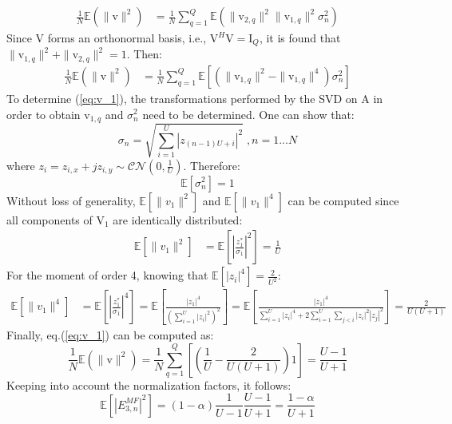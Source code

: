\documentclass[12pt, draftclsnofoot, onecolumn]{IEEEtran}
\newcommand{\EX}[1]{\mathbb{E} \left[#1\right]}%
\newcommand{\vect}[1]{\boldsymbol{\mathrm{#1}}}
\newcommand{\mat}[1]{\boldsymbol{\mathrm{#1}}}
\begin{document}
\begin{align}
\frac{1}{N}\mathbb{E}\left(\|\vect{v}\|^2\right) &=\frac{1}{N}\sum_{q=1}^Q \mathbb{E} \left( \| \vect{v}_{2,q}\|^2 \| \vect{v}_{1,q}\|^2 \sigma_n^2  \right)
\end{align}
Since $\mat{V}$ forms an orthonormal basis, i.e., $\mat{V}^H \mat{V} = \mat{I}_Q$, it is found that $ \| \vect{v}_{1,q}\|^2 +  \| \vect{v}_{2,q}\|^2 = 1$. Then:
\begin{align}
\frac{1}{N}\mathbb{E}\left(\|\vect{v}\|^2\right) &=\frac{1}{N}\sum_{q=1}^Q \mathbb{E} \left[ \left( \| \vect{v}_{1,q}\|^2 - \| \vect{v}_{1,q}\|^4 \right) \sigma_n^2  \right]
\label{eq:v_1}
\end{align}
To determine (\ref{eq:v_1}), the transformations performed by the SVD on $\mat{A}$ in order to obtain $\vect{v}_{1,q}$ and $\sigma^2_n$ need to be determined. One can show that:
\begin{equation}
	\sigma_n = \sqrt{\sum_{i=1}^{U} \left| z_{(n-1)U+i}\right|^2} \; , n = 1...N
\end{equation}
where $z_i  = z_{i,x} + jz_{i,y} \sim \mathcal{CN}(0,\frac{1}{U})$. Therefore:
\begin{equation}
	\mathbb{E} \left[\sigma_n^2 \right] = 1
\end{equation}
Without loss of generality, $\mathbb{E} \left[ \| v_1\|^2 \right]$ and $\mathbb{E} \left[ \| v_1\|^4 \right]$  can be computed since all components of $\mat{V}_1$ are identically distributed:
\begin{equation}
	\begin{split}
	\mathbb{E} \left[ \| v_1\|^2 \right] &= \mathbb{E}\left[ \left| \frac{z_1^*}{\sigma_1}\right|^2\right]  = \frac{1}{U}
	\end{split}
\end{equation}
For the moment of order 4, knowing that $\mathbb{E}\left[ \left| z_i \right|^4\right] = \frac{2}{U^2}$:
\begin{equation}
	\begin{split}
	\mathbb{E} \left[ \| v_1\|^4 \right] &= \mathbb{E}\left[ \left| \frac{z_1^*}{\sigma_1}\right|^4\right] 
	 =  \mathbb{E} \left[   \frac{\left| z_1 \right|^4 }{  \left( \sum_{i=1}^{U} \left| z_i\right|^2 \right)^2 }  \right] \label{eq:moment_4_1} 
	= \mathbb{E} \left[   \frac{\left| z_1 \right|^4 }{  \sum_{i=1}^{U} \left| z_i\right|^4 + 2 \sum_{i=1}^{U} \sum_{j<i} \left|z_i\right|^2 \left|z_j\right|^2 }  \right] = \frac{2}{U(U+1)}
	\end{split}
\end{equation}
Finally, eq.(\ref{eq:v_1}) can be computed as:
\begin{equation}
	\frac{1}{N}\mathbb{E}\left(\|\vect{v}\|^2\right)=\frac{1}{N} \sum_{q=1}^{Q} \left[ \left( \frac{1}{U} - \frac{2}{U(U+1)} \right) 1\right] = \frac{U-1}{U+1} \label{eq:final_an_result_no_correction}
\end{equation}
Keeping into account the normalization factors, it follows:
\begin{equation}
	\EX{|E_{3,n}^{MF}|^2} = (1-\alpha)\frac{1}{U-1}\frac{U-1}{U+1}  =  \frac{1-\alpha}{U+1}
	\label{eq:an_eve_filt1-app}
\end{equation}
\end{document}
